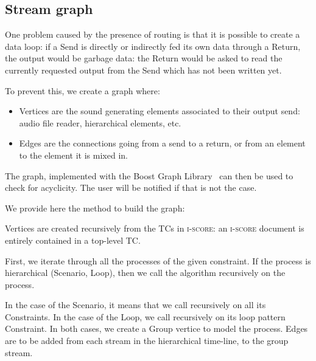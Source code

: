 \documentclass{article}
\newcommand*{\iscore}{\textsc{i-score}\xspace}
\newcommand*{\timeconstraint}{\ac{TC}\xspace}
\newcommand*{\timeconstraints}{\acp{TC}\xspace}
\begin{document}
\subsection{Stream graph}
One problem caused by the presence of routing is that it is possible 
to create a data loop: if a Send is directly or indirectly fed its own data through a Return, 
the output would be garbage data: the Return would be asked to read 
the currently requested output from the Send which has not been written yet.

To prevent this, we create a graph where: 
\begin{itemize}
	\item Vertices are the sound generating elements associated to their output send: audio file reader, hierarchical elements, etc.
	\item Edges are the connections going from a send to a return, or from an element to the element it is mixed in.
\end{itemize} 

The graph, implemented with the Boost Graph Library~\cite{siek2001boost} can then be used to 
check for acyclicity. 
The user will be notified if that is not the case.

We provide here the method to build the graph:

Vertices are created recursively from the \timeconstraints in \iscore: an \iscore document is entirely contained in a top-level \timeconstraint.

First, we iterate through all the processes of the given constraint.
If the process is hierarchical (Scenario, Loop), then we call the algorithm recursively on the process.

In the case of the Scenario, it means that we call recursively on all its Constraints.
In the case of the Loop, we call recursively on its loop pattern Constraint.
In both cases, we create a Group vertice to model the process. 
Edges are to be added from each stream in the hierarchical time-line, to the group stream.
\end{document}

